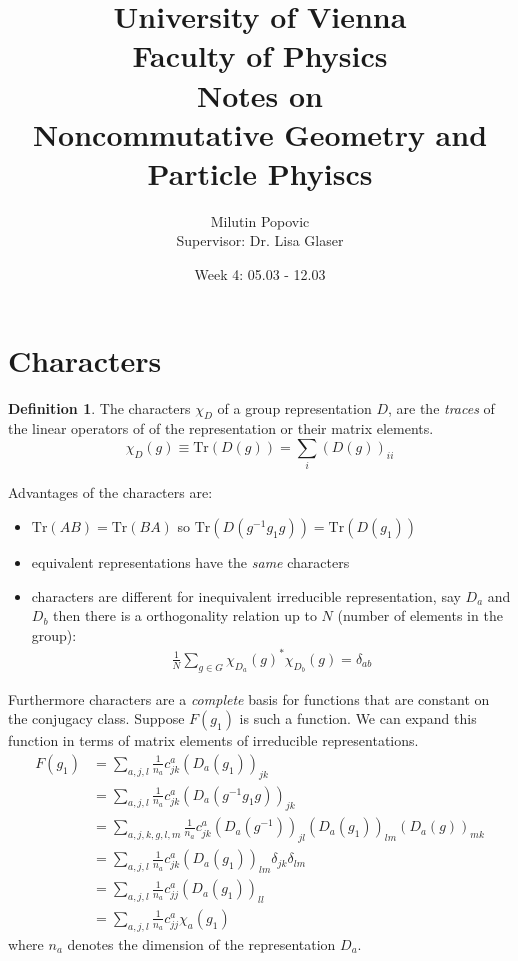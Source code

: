 \documentclass[a4paper]{article}
\title{University of Vienna\\ Faculty of Physics\\ \vspace{1.25cm}
Notes on\\ Noncommutative Geometry and Particle Phyiscs}
\author{Milutin Popovic \\ Supervisor: Dr. Lisa
Glaser}
\date{Week 4: 05.03 - 12.03}
\theoremstyle{definition}
\newtheorem{definition}{Definition}
\theoremstyle{definition}
\theoremstyle{definition}
\theoremstyle{theorem}
\theoremstyle{theorem}
\theoremstyle{definition}
\begin{document}
    \maketitle
    \tableofcontents
    \newpage

\section{Characters}
\begin{definition}
    The characters $\chi _D$ of a group representation $D$, are the \textit{traces} of the linear operators
    of of the representation or their matrix elements.
    \begin{equation}
        \chi _D (g) \equiv \text{Tr}(D(g)) = \sum _i (D(g))_{ii}
    \end{equation}
\end{definition}
Advantages of the characters are:
\begin{itemize}
    \item $\text{Tr}(AB) = \text{Tr}(BA)$ so $\text{Tr}(D(g^{-1}g_1g)) = \text{Tr}(D(g_1))$
    \item equivalent representations have the \textit{same} characters
    \item characters are different for inequivalent irreducible representation,
        say $D_a$ and $D_b$ then there is a orthogonality relation up to $N$
        (number of elements in the group):
        \begin{align}
            \frac{1}{N} \sum _{g\in G} \chi _{D_a}(g)^*\chi_{D_b}(g) = \delta _{ab}
        \end{align}
\end{itemize}
Furthermore characters are a \textit{complete} basis for functions that are constant on the conjugacy
    class. Suppose $F(g_1)$ is such a function. We can expand this function in terms of matrix elements
    of irreducible representations.
    \begin{align}
        F(g_1) &= \sum_{a,j,l}\frac{1}{n_a} c_{jk}^{a} (D_a(g_1))_{jk}  \\
                &= \sum_{a,j,l}\frac{1}{n_a} c_{jk}^{a} (D_a(g^{-1}g_1g))_{jk}  \\
                &= \sum_{a,j,k,g,l,m}\frac{1}{n_a} c_{jk}^{a} (D_a(g^{-1}))_{jl}(D_a(g_1))_{lm}(D_a(g))_{mk} \\
                &= \sum_{a,j,l}\frac{1}{n_a} c_{jk}^{a} (D_a(g_1))_{lm} \delta _{jk} \delta _{lm} \\
                &= \sum_{a,j,l}\frac{1}{n_a} c_{jj}^{a} (D_a(g_1))_{ll}  \\
                &= \sum_{a,j,l}\frac{1}{n_a} c_{jj}^{a} \chi _a (g_1)
    \end{align}
where $n_a$ denotes the dimension of the representation $D_a$.
\newline
\end{document}
